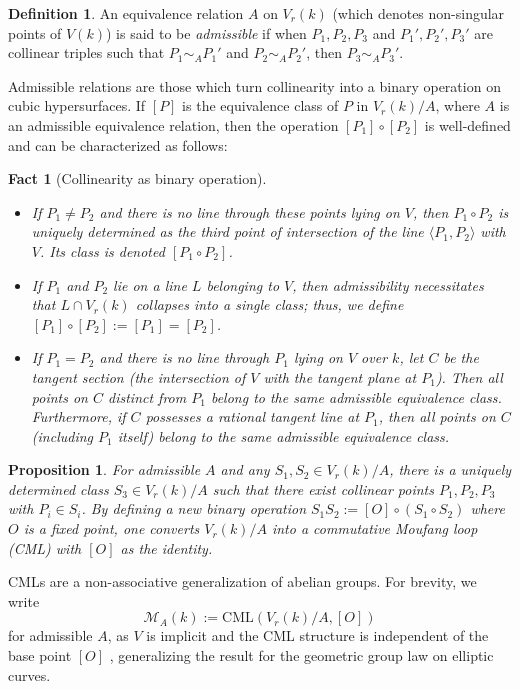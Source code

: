 \documentclass[11pt]{article}
\newtheorem{proposition}[theorem]{Proposition}
\newtheorem{fact}[theorem]{Fact}
\theoremstyle{definition}
\newtheorem{definition}[theorem]{Definition}
\newcommand{\CML}{\mathrm{CML}}
\begin{document}
\begin{definition}
An equivalence relation $A$ on $V_r(k)$ (which denotes non-singular points of $V(k)$) is said to be \textit{admissible} if when $P_1, P_2, P_3$ and $P_1', P_2', P_3'$ are collinear triples such that $P_1 \sim_A P_1'$ and $P_2 \sim_A P_2'$, then $P_3 \sim_A P_3'$.
\end{definition}
\noindent
Admissible relations are those which turn collinearity into a binary operation on cubic hypersurfaces. 
If $[P]$ is the equivalence class of $P$ in $V_r(k)/A$, where $A$ is an admissible equivalence relation, then the operation $[P_1] \circ [P_2]$ is well-defined and can be characterized as follows:
\begin{fact}[Collinearity as binary operation]
\label{item}
\mbox{}
\begin{itemize}
    \item If $P_1 \neq P_2$ and there is no line through these points lying on $V$, then $P_1 \circ P_2$ is uniquely determined as the third point of intersection of the line $\langle P_1, P_2 \rangle$ with $V$. Its class is denoted $[P_1 \circ P_2]$.
    \item If $P_1$ and $P_2$ lie on a line $L$ belonging to $V$, then admissibility necessitates that $L \cap V_r(k)$ collapses into a single class; thus, we define $[P_1] \circ [P_2] := [P_1] = [P_2]$.
    \item If $P_1 = P_2$ and there is no line through $P_1$ lying on $V$ over $k$, let $C$ be the tangent section (the intersection of $V$ with the tangent plane at $P_1$). Then all points on $C$ distinct from $P_1$ belong to the same admissible equivalence class. Furthermore, if $C$ possesses a rational tangent line at $P_1$, then all points on $C$ (including $P_1$ itself) belong to the same admissible equivalence class.
\end{itemize}
\end{fact}

\begin{proposition}
For admissible $A$ and any $S_1, S_2 \in V_r(k)/A$, there is a uniquely determined class $S_3 \in V_r(k)/A$ such that there exist collinear points $P_1, P_2, P_3$ with $P_i \in S_i$. By defining a new binary operation $S_1 S_2 := [O] \circ (S_1 \circ S_2)$ where $O$ is a fixed point, one converts $V_r(k)/A$ into a \textit{commutative Moufang loop (CML)} with $[O]$ as the identity.
\end{proposition}
\noindent CMLs are a non-associative generalization of abelian groups. For brevity, we write
\[
\mathcal{M}_A(k) := \CML(V_r(k)/A, [O])
\]
for admissible $A$, as $V$ is implicit and the CML structure is independent of the base point $[O]$ \cite[5.1]{manin3}, generalizing the result for the geometric group law on elliptic curves.
\end{document}
